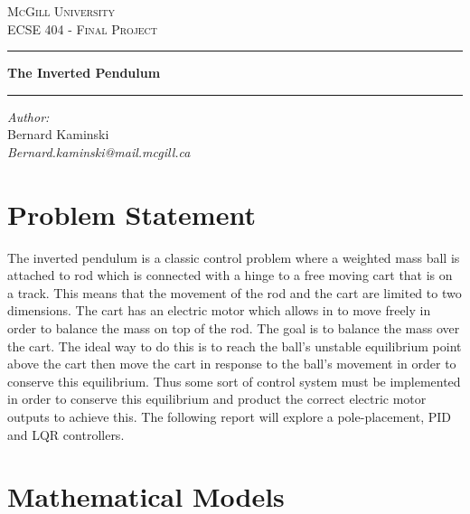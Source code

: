 \documentclass[12pt]{article} %
\newcommand{\HRule}[1][\medskipamount]{\par
  \vspace*{\dimexpr-\parskip-\baselineskip+#1}
  \noindent\rule{\linewidth}{0.2mm}\par
  \vspace*{\dimexpr-\parskip-.5\baselineskip+#1}}
\begin{document}
\begin{titlepage}
\begin{center}
\textsc{\LARGE McGill University}\\[1.5cm]
\textsc{\Large ECSE 404 - Final Project}\\[4cm]
\HRule
{\huge \bfseries The Inverted Pendulum \\[.8cm] }
\HRule 
\vspace{1.5cm}
\noindent
\begin{minipage}{0.4\textwidth}
\begin{flushleft} \large
\emph{\Large Author:}\\
Bernard {Kaminski} \\
\textit{Bernard.kaminski@mail.mcgill.ca} \\
\end{flushleft}
\end{minipage}%
\end{center}
\end{titlepage}
\pagebreak
\tableofcontents
\pagebreak
\section{Problem Statement}
The inverted pendulum is a classic control problem where a weighted mass ball is attached to rod which is connected with a hinge to a free moving cart that is on a track. This means that the movement of the rod and the cart are limited to two dimensions. The cart has an electric motor which allows in to move freely in order to balance the mass on top of the rod. The goal is to balance the mass over the cart. The ideal way to do this is to reach the ball’s unstable equilibrium point above the cart then move the cart in response to the ball’s movement in order to conserve this equilibrium. Thus some sort of control system must be implemented in order to conserve this equilibrium and product the correct electric motor outputs to achieve this. The following report will explore a pole-placement, PID and LQR controllers. 
\section{Mathematical Models}
\end{document}
